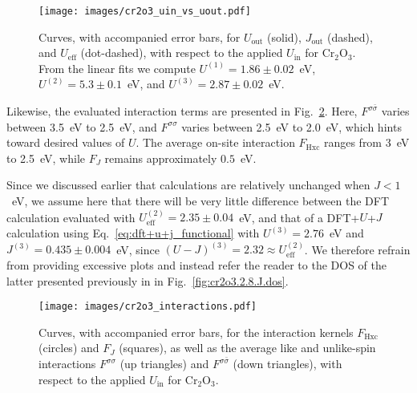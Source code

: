 \begin{figure}[th!]
\centering
\texttt{[image: images/cr2o3\_uin\_vs\_uout.pdf]}
\caption[Self-consistency profile for Cr$_2$O$_3$]
{Curves, with accompanied error bars, 
for $U_\textrm{out}$ (solid), 
$J_\textrm{out}$ (dashed), 
and $U_\textrm{eff}$ (dot-dashed), 
with respect to the applied $U_\textrm{in}$ 
for Cr$_2$O$_3$. 
%
From the linear fits we compute 
$U^{(1)}=1.86\pm0.02$~eV,
$U^{(2)}=5.3\pm0.1$~eV, 
and $U^{(3)}=2.87\pm0.02$~eV.}
\label{fig:cr2o3_uin_vs_uout}
\end{figure}

Likewise, 
the evaluated interaction terms 
are presented in Fig.~\ref{fig:cr2o3_interactions}.
%
Here, 
$F^{\sigma\bar{\sigma}}$ varies between 3.5~eV to 2.5~eV, 
and $F^{\sigma\sigma}$ varies between 2.5~eV to 2.0~eV, 
which hints toward desired values of $U$.
%
The average on-site interaction $F_\textrm{Hxc}$ 
ranges from 3~eV to 2.5~eV, 
while $F_J$ remains approximately $0.5$~eV.

Since we discussed earlier that calculations 
are relatively unchanged when $J<1$~eV, 
we assume here that there will be very little difference between 
the DFT calculation evaluated with 
$U^{(2)}_\textrm{eff}=2.35\pm0.04$~eV, 
and that of a DFT+$U$+$J$ calculation 
using Eq.~\eqref{eq:dft+u+j_functional}
with $U^{(3)}=2.76$~eV and $J^{(3)}=0.435\pm0.004$~eV, 
since $(U-J)^{(3)}=2.32\approx U^{(2)}_\textrm{eff}$.
% 
We therefore refrain from 
providing excessive plots 
and instead refer the reader to 
the DOS of the latter presented previously in  
in Fig.~\ref{fig:cr2o3.2.8.J.dos}.

\clearpage
\begin{figure}[th!]
\centering
\texttt{[image: images/cr2o3\_interactions.pdf]}
\caption[Profiles of $F_\textrm{Hxc}$, $F_J$,  $F^{\sigma\sigma}$
and  $F^{\sigma\bar{\sigma}}$ vs $U_\textrm{in}$ for Cr$_2$O$_3$]
{Curves, with accompanied error bars, 
for the interaction kernels 
$F_\textrm{Hxc}$ (circles) and $F_J$ (squares), 
as well as the average like and unlike-spin interactions 
$F^{\sigma\sigma}$ (up triangles) and $F^{\sigma\bar{\sigma}}$ (down triangles), 
with respect to the applied $U_\textrm{in}$ for Cr$_2$O$_3$.}
\label{fig:cr2o3_interactions}
\end{figure}




